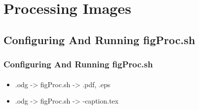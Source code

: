 \begin{comment}
*  [[elisp:(org-cycle)][| ]] [[elisp:(org-show-subtree)][|=]] [[elisp:(show-children 10)][|V]] [[elisp:(bx:orgm:indirectBufOther)][|>]] [[elisp:(bx:orgm:indirectBufMain)][|I]] [[elisp:(blee:ppmm:org-mode-toggle)][|N]] [[elisp:(org-top-overview)][|O]] [[elisp:(progn (org-shifttab) (org-content))][|C]] [[elisp:(delete-other-windows)][|1]]  /Section/   Processing Images ::  [[elisp:(org-cycle)][| ]]
\end{comment}

\section{Processing Images}


\begin{comment}
**  [[elisp:(org-cycle)][| ]] [[elisp:(org-show-subtree)][|=]] [[elisp:(show-children 10)][|V]] [[elisp:(bx:orgm:indirectBufOther)][|>]] [[elisp:(bx:orgm:indirectBufMain)][|I]] [[elisp:(blee:ppmm:org-mode-toggle)][|N]] [[elisp:(org-top-overview)][|O]] [[elisp:(progn (org-shifttab) (org-content))][|C]] [[elisp:(delete-other-windows)][|1]]  /Subsection/   Configuring And Running figProc.sh ::  [[elisp:(org-cycle)][| ]]
\end{comment}

\subsection{Configuring And Running figProc.sh}



\begin{comment}
*****  [[elisp:(org-cycle)][| ]]  [[elisp:(blee:ppmm:org-mode-toggle)][Nat]] [[elisp:(beginning-of-buffer)][Top]] [[elisp:(delete-other-windows)][(1)]] || /Frame/ *Label=ConfiguringAndRunningfigProc.sh*  Configuring And Running figProc.sh ::  [[elisp:(org-cycle)][| ]]
\end{comment}

\begin{frame}[fragile,label=ConfiguringAndRunningfigProc.sh]
    \frametitle{Configuring And Running figProc.sh}
    \framesubtitle{}


    \begin{itemize}
    \item .odg  -> figProc.sh -> .pdf, .eps
    \item .odg  -> figProc.sh -> -caption.tex      
    \end{itemize}

\end{frame}



